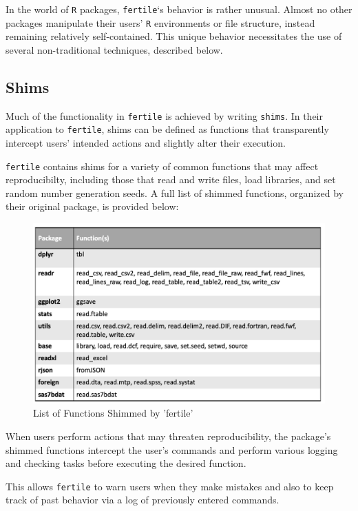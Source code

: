 \documentclass[12pt,twoside]{reedthesis}
\begin{document}
In the world of \texttt{R} packages, \texttt{fertile}`s behavior is rather unusual. Almost no other packages manipulate their users' \texttt{R} environments or file structure, instead remaining relatively self-contained. This unique behavior necessitates the use of several non-traditional techniques, described below.

\hypertarget{shims}{%
\subsection{Shims}\label{shims}}

Much of the functionality in \texttt{fertile} is achieved by writing \texttt{shims}. In their application to \texttt{fertile}, shims can be defined as functions that transparently intercept users' intended actions and slightly alter their execution.

\texttt{fertile} contains shims for a variety of common functions that may affect reproducibilty, including those that read and write files, load libraries, and set random number generation seeds. A full list of shimmed functions, organized by their original package, is provided below:
\begin{figure}
\includegraphics[width=1\linewidth]{figure/shims-list} \caption{List of Functions Shimmed by 'fertile'}\label{fig:unnamed-chunk-35}
\end{figure}
When users perform actions that may threaten reproducibility, the package's shimmed functions intercept the user's commands and perform various logging and checking tasks before executing the desired function.

This allows \texttt{fertile} to warn users when they make mistakes and also to keep track of past behavior via a log of previously entered commands.
\end{document}
